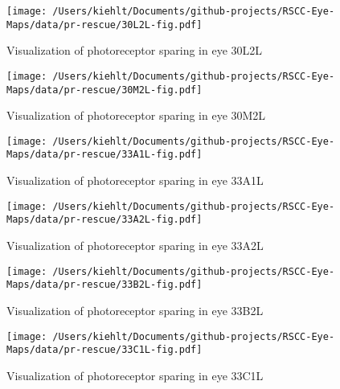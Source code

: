 \documentclass{article}
\begin{document}
\begin{center}
\begin{figure}
\texttt{[image: /Users/kiehlt/Documents/github-projects/RSCC-Eye-Maps/data/pr-rescue/30L2L-fig.pdf]}
\caption{Visualization of photoreceptor sparing in eye 30L2L}
\label{fig:30L2L}
\end{figure}

\end{center}
\begin{center}
\begin{figure}
\texttt{[image: /Users/kiehlt/Documents/github-projects/RSCC-Eye-Maps/data/pr-rescue/30M2L-fig.pdf]}
\caption{Visualization of photoreceptor sparing in eye 30M2L}
\label{fig:30M2L}
\end{figure}

\end{center}
\begin{center}
\begin{figure}
\texttt{[image: /Users/kiehlt/Documents/github-projects/RSCC-Eye-Maps/data/pr-rescue/33A1L-fig.pdf]}
\caption{Visualization of photoreceptor sparing in eye 33A1L}
\label{fig:33A1L}
\end{figure}

\end{center}
\begin{center}
\begin{figure}
\texttt{[image: /Users/kiehlt/Documents/github-projects/RSCC-Eye-Maps/data/pr-rescue/33A2L-fig.pdf]}
\caption{Visualization of photoreceptor sparing in eye 33A2L}
\label{fig:33A2L}
\end{figure}

\end{center}
\begin{center}
\begin{figure}
\texttt{[image: /Users/kiehlt/Documents/github-projects/RSCC-Eye-Maps/data/pr-rescue/33B2L-fig.pdf]}
\caption{Visualization of photoreceptor sparing in eye 33B2L}
\label{fig:33B2L}
\end{figure}

\end{center}
\begin{center}
\begin{figure}
\texttt{[image: /Users/kiehlt/Documents/github-projects/RSCC-Eye-Maps/data/pr-rescue/33C1L-fig.pdf]}
\caption{Visualization of photoreceptor sparing in eye 33C1L}
\label{fig:33C1L}
\end{figure}

\end{center}
\end{document}
